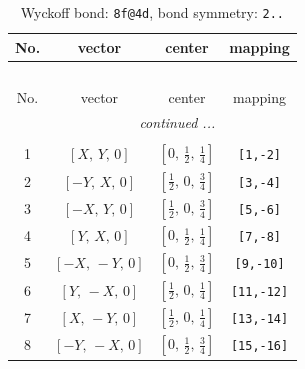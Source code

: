 \documentclass[fleqn,8pt]{jsarticle}
\begin{document}
\begin{longtable}{cccc}
\caption{Wyckoff bond: {\tt 8f@4d}, bond symmetry: {\tt 2..}}
 \\
 \hline \hline
No. & vector & center & mapping \\ \hline \endfirsthead

\multicolumn{3}{l}{\tablename\ \thetable{}} \\
 \hline \hline
No. & vector & center & mapping \\ \hline \endhead

 \hline \hline
\multicolumn{3}{r}{\footnotesize\it continued ...} \\ \endfoot

 \hline \hline
\multicolumn{3}{r}{} \\ \endlastfoot

1 & $\left[ X,\, Y,\, 0 \right]$ & $\left[ 0,\, \frac{1}{2},\, \frac{1}{4} \right]$ & {\tt [1,-2]} \\ \hline
2 & $\left[ - Y,\, X,\, 0 \right]$ & $\left[ \frac{1}{2},\, 0,\, \frac{3}{4} \right]$ & {\tt [3,-4]} \\ \hline
3 & $\left[ - X,\, Y,\, 0 \right]$ & $\left[ \frac{1}{2},\, 0,\, \frac{3}{4} \right]$ & {\tt [5,-6]} \\ \hline
4 & $\left[ Y,\, X,\, 0 \right]$ & $\left[ 0,\, \frac{1}{2},\, \frac{1}{4} \right]$ & {\tt [7,-8]} \\ \hline
5 & $\left[ - X,\, - Y,\, 0 \right]$ & $\left[ 0,\, \frac{1}{2},\, \frac{3}{4} \right]$ & {\tt [9,-10]} \\ \hline
6 & $\left[ Y,\, - X,\, 0 \right]$ & $\left[ \frac{1}{2},\, 0,\, \frac{1}{4} \right]$ & {\tt [11,-12]} \\ \hline
7 & $\left[ X,\, - Y,\, 0 \right]$ & $\left[ \frac{1}{2},\, 0,\, \frac{1}{4} \right]$ & {\tt [13,-14]} \\ \hline
8 & $\left[ - Y,\, - X,\, 0 \right]$ & $\left[ 0,\, \frac{1}{2},\, \frac{3}{4} \right]$ & {\tt [15,-16]} \\
\end{longtable}
\renewcommand{\arraystretch}{1.2}
\end{document}
